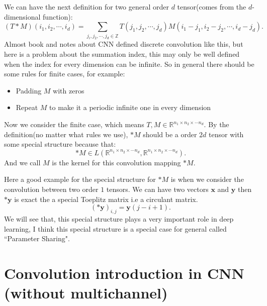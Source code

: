 We can have the next definition for two general order $d$ tensor(comes from the $d$-dimensional function):
\begin{equation}
(T\ast M)(i_1, i_2, \cdots ,i_d) = \sum_{j_i, j_2,\cdots,j_d \in \mathbb{Z}} T(j_1, j_2,\cdots,j_d)M(i_1 - j_1, i_2 - j_2, \cdots, i_d - j_d).
\end{equation}
Almost book and notes about CNN defined discrete convolution like this, but here is a problem about the summation  index, this may only be well defined when the index for every dimension can be infinite. So in general there should be some rules for finite cases, for example: 
\begin{itemize}
\item Padding $M$ with zeros
\item Repeat $M$ to make it a periodic infinite one in every dimension
\end{itemize}
Now we consider the finite case, which means $T, M \in \mathbb{R}^{n_1 \times n_2 \times \cdots n_d}$. By the definition(no matter what rules we use), $\ast M$ should be a order $2d$ tensor with some special structure because that:
\begin{equation}
\ast M \in L(\mathbb{R}^{n_1 \times n_2 \times \cdots n_d}, \mathbb{R}^{n_1 \times n_2 \times \cdots n_d}).
\end{equation}
And we call $M$ is the kernel for this convolution mapping $\ast M$.

Here a good example for the special structure for $\ast M$ is when we consider the convolution between two order $1$ tensors. We can have two vectors $\bm{x}$ and $\bm y$ then $\ast \bm y$ is exact the a special Toeplitz matrix i.e a circulant matrix. 
\begin{equation}
(\ast \bm{y})_{i,j} = \bm{y}(j-i+1).
\end{equation}
We will see that, this special structure plays a very important role in deep learning, I think this special structure is a special case for general called ``Parameter Sharing".  



\section{Convolution introduction in CNN (without multichannel)}
